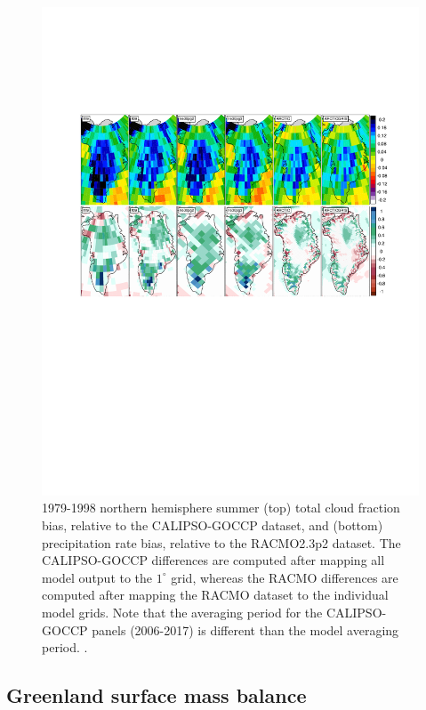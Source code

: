 \documentclass[draft]{agujournal2019}
\begin{document}
\begin{figure}[t]
\begin{center}
         \includegraphics[width=130mm]{figs/temp_contours_diffCERESdiffRACMO_CLOUD_PRECIP.pdf}
\end{center}
\caption{1979-1998 northern hemisphere summer (top) total cloud fraction bias, relative to the CALIPSO-GOCCP dataset, and (bottom) precipitation rate bias, relative to the RACMO2.3p2 dataset. The CALIPSO-GOCCP differences are computed after mapping all model output to the $1^{\circ}$ grid, whereas the RACMO differences are computed after mapping the RACMO dataset to the individual model grids. Note that the averaging period for the CALIPSO-GOCCP panels (2006-2017) is different than the model averaging period. \color{red}{ARH - still trying to fix the layout of this figure so the label bars aren't on top of the panels}.}
\label{fig:prect}
\end{figure}

\subsection{Greenland surface mass balance}
\end{document}
